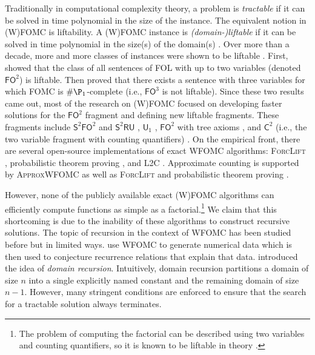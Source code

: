 \documentclass[letterpaper]{article} %
\newcommand{\FOtwo}{$\mathsf{FO}^{2}$}
\newcommand{\FOthree}{$\mathsf{FO}^{3}$}
\newcommand{\SFO}{$\mathsf{S}^{2}\mathsf{FO}^{2}$}
\newcommand{\SRU}{$\mathsf{S}^{2}\mathsf{RU}$}
\newcommand{\Uone}{$\mathsf{U}_{1}$}
\newcommand{\Ctwo}{$\mathsf{C}^{2}$}
\theoremstyle{definition}
\theoremstyle{remark}
\begin{document}
Traditionally in computational complexity theory, a problem is \emph{tractable}
if it can be solved in time polynomial in the size of the instance. The
equivalent notion in (W)FOMC is liftability. A (W)FOMC instance is
\emph{(domain-)liftable} if it can be solved in time polynomial in the size(s)
of the domain(s) \citep{jaeger2012liftability}. Over more than a decade, more
and more classes of instances were shown to be liftable
\citep{DBLP:conf/kr/BremenK21,DBLP:conf/nips/KazemiKBP16,DBLP:conf/lics/KuusistoL18,DBLP:journals/jair/Kuzelka21}.
First, \citet{DBLP:conf/nips/Broeck11} showed that the class of all sentences of
FOL with up to two variables (denoted \FOtwo{}) is liftable. Then
\citet{DBLP:conf/pods/BeameBGS15} proved that there exists a sentence with three
variables for which FOMC is $\#\P_{1}$-complete (i.e., \FOthree{} is not
liftable). Since these two results came out, most of the research on (W)FOMC
focused on developing faster solutions for the \FOtwo{} fragment
\citep{DBLP:conf/uai/BremenK21,DBLP:conf/aaai/MalhotraS22} and defining
new liftable fragments. These fragments include \SFO{} and \SRU{}
\citep{DBLP:conf/nips/KazemiKBP16}, \Uone{} \citep{DBLP:conf/lics/KuusistoL18},
\FOtwo{} with tree axioms \citep{DBLP:conf/kr/BremenK21}, and \Ctwo{} (i.e., the
two variable fragment with counting quantifiers)
\citep{DBLP:journals/jair/Kuzelka21,DBLP:conf/aaai/MalhotraS22}. On the
empirical front, there are several open-source implementations of exact WFOMC
algorithms: \textsc{ForcLift} \citep{DBLP:conf/ijcai/BroeckTMDR11},
probabilistic theorem proving \citep{DBLP:journals/cacm/GogateD16}, and
\textsc{L2C} \citep{DBLP:conf/kr/KazemiP16}. Approximate counting is supported
by \textsc{ApproxWFOMC} \citep{DBLP:conf/ijcai/BremenK20} as well as
\textsc{ForcLift} \citep{DBLP:conf/uai/BroeckCD12} and probabilistic theorem
proving \citep{DBLP:journals/cacm/GogateD16}.


However, none of the publicly available exact (W)FOMC algorithms can efficiently
compute functions as simple as a factorial.\footnote{The problem of computing
  the factorial can be described using two variables and counting quantifiers,
  so it is known to be liftable in theory \citep{DBLP:journals/jair/Kuzelka21}.}
We claim that this shortcoming is due to the inability of these algorithms to
construct recursive solutions. The topic of recursion in the context of WFOMC
has been studied before but in limited ways.
 use WFOMC to generate numerical data which
is then used to conjecture recurrence relations that explain that data.
 introduced the idea of \emph{domain recursion}.
Intuitively, domain recursion partitions a domain of size $n$ into a single
explicitly named constant and the remaining domain of size $n-1$. However, many
stringent conditions are enforced to ensure that the search for a tractable
solution always terminates.
\end{document}
